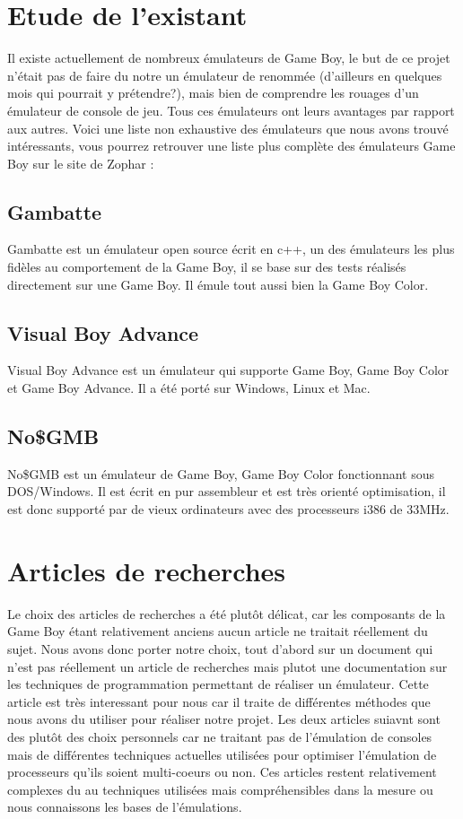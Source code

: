 \documentclass{report}
\begin{document}
\section{Etude de l'existant}
Il existe actuellement de nombreux émulateurs de Game Boy, le but de ce projet n'était pas de faire du notre un émulateur de renommée (d'ailleurs en quelques mois qui pourrait y prétendre?), mais bien de comprendre les rouages d'un émulateur de console de jeu.
Tous ces émulateurs ont leurs avantages par rapport aux autres. Voici une liste non exhaustive des émulateurs que nous avons trouvé intéressants, vous pourrez retrouver une liste plus complète des émulateurs Game Boy sur le site de Zophar \cite{zophar}:

\subsection{Gambatte}
Gambatte \cite{gambatte} est un émulateur open source écrit en c++, un des émulateurs les plus fidèles au comportement de la Game Boy, il se base sur des tests réalisés directement sur une Game Boy. Il émule tout aussi bien la Game Boy Color.
\subsection{Visual Boy Advance}
Visual Boy Advance \cite{visualboyadv} est un émulateur qui supporte Game Boy, Game Boy Color et Game Boy Advance. Il a été porté sur Windows, Linux et Mac.
\subsection{No\$GMB}
No\$GMB \cite{nogmb} est un émulateur de Game Boy, Game Boy Color fonctionnant sous DOS/Windows. Il est écrit en pur assembleur et est très orienté optimisation, il est donc supporté par de vieux ordinateurs avec des processeurs i386 de 33MHz.
\section{Articles de recherches}
Le choix des articles de recherches a été plutôt délicat, car les composants de la Game Boy étant relativement anciens aucun article ne traitait réellement du sujet. Nous avons donc porter notre choix, tout d'abord sur un document qui n'est pas réellement un article de recherches mais plutot une documentation sur les techniques de programmation permettant de réaliser un émulateur. Cette article est très interessant pour nous car il traite de différentes méthodes que nous avons du utiliser pour réaliser notre projet. Les deux articles suiavnt sont des plutôt des choix personnels car ne traitant pas de l'émulation de consoles mais de différentes techniques actuelles utilisées pour optimiser l'émulation de processeurs qu'ils soient multi-coeurs ou non. Ces articles restent relativement complexes du au techniques utilisées mais compréhensibles dans la mesure ou nous connaissons les bases de l'émulations.
\end{document}
